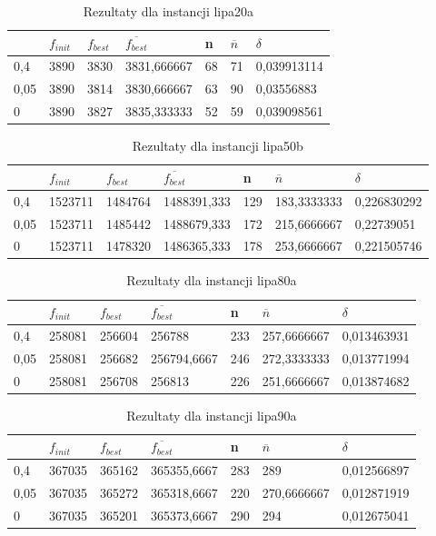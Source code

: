 \begin{table}[H]
\label{T4_lipa20a}
\begin{tabular}{l l l l l l l}
\hline
 & $f_{init}$ & $f_{best}$ & $\overline{f_{best}}$ & n & $\overline{n}$ & $\delta$ \\
\hline
0,4 & 3890 & 3830 & 3831,666667 & 68 & 71 & 0,039913114\\
0,05 & 3890 & 3814 & 3830,666667 & 63 & 90 & 0,03556883\\
0 & 3890 & 3827 & 3835,333333 & 52 & 59 & 0,039098561\\
\hline
\end{tabular}
\caption{Rezultaty dla instancji lipa20a}
\end{table}

\begin{table}[H]
\label{T4_lipa50b}
\begin{tabular}{l l l l l l l}
\hline
 & $f_{init}$ & $f_{best}$ & $\overline{f_{best}}$ & n & $\overline{n}$ & $\delta$ \\
\hline
0,4 & 1523711 & 1484764 & 1488391,333 & 129 & 183,3333333 & 0,226830292\\
0,05 & 1523711 & 1485442 & 1488679,333 & 172 & 215,6666667 & 0,22739051\\
0 & 1523711 & 1478320 & 1486365,333 & 178 & 253,6666667 & 0,221505746\\
\hline
\end{tabular}
\caption{Rezultaty dla instancji lipa50b}
\end{table}

\begin{table}[H]
\label{T4_lipa80a}
\begin{tabular}{l l l l l l l}
\hline
 & $f_{init}$ & $f_{best}$ & $\overline{f_{best}}$ & n & $\overline{n}$ & $\delta$ \\
\hline
0,4 & 258081 & 256604 & 256788 & 233 & 257,6666667 & 0,013463931\\
0,05 & 258081 & 256682 & 256794,6667 & 246 & 272,3333333 & 0,013771994\\
0 & 258081 & 256708 & 256813 & 226 & 251,6666667 & 0,013874682\\
\hline
\end{tabular}
\caption{Rezultaty dla instancji lipa80a}
\end{table}

\begin{table}[H]
\label{T4_lipa90a}
\begin{tabular}{l l l l l l l}
\hline
 & $f_{init}$ & $f_{best}$ & $\overline{f_{best}}$ & n & $\overline{n}$ & $\delta$ \\
\hline
0,4 & 367035 & 365162 & 365355,6667 & 283 & 289 & 0,012566897\\
0,05 & 367035 & 365272 & 365318,6667 & 220 & 270,6666667 & 0,012871919\\
0 & 367035 & 365201 & 365373,6667 & 290 & 294 & 0,012675041\\
\hline
\end{tabular}
\caption{Rezultaty dla instancji lipa90a}
\end{table}

